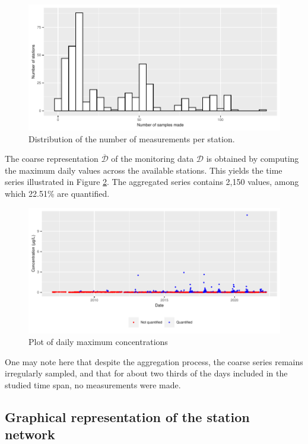 \begin{figure}[ht]
  \centering
  \includegraphics[]{figs/Chap5/hist_samp_sta.pdf}
  \caption{Distribution of the number of measurements per station.}
  \label{fig:histogram}
\end{figure}

The coarse representation $\overline{\mathcal{D}}$ of the monitoring data $\mathcal{D}$ is obtained by computing the maximum daily values across the available stations. This yields the time series illustrated in Figure \ref{time:serie}. The aggregated series contains 2,150 values, among which 22.51\% are quantified. 

\begin{figure}[ht]
  \centering
  \includegraphics[]{figs/Chap5/Max_temp-1.pdf}
  \caption{Plot of daily maximum concentrations}
  \label{time:serie}
\end{figure}

One may note here that despite the aggregation process, the coarse series remains irregularly sampled, and that for about two thirds of the days included in the studied time span, no measurements were made. 

\subsection{Graphical representation of the station network}

